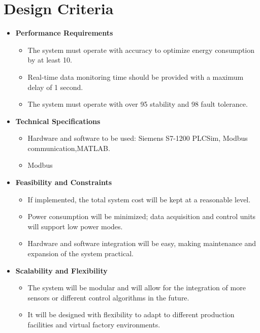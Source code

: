 \section{Design Criteria}
\begin{itemize}
    \item \textbf{Performance Requirements}
    \begin{itemize}
        \item The system must operate with accuracy to optimize energy consumption by at least 10.
        \item Real-time data monitoring time should be provided with a maximum delay of 1 second.
        \item The system must operate with over 95 stability and 98 fault tolerance.
    \end{itemize}

    \item \textbf{Technical Specifications}
    \begin{itemize}
        \item Hardware and software to be used: Siemens S7-1200 PLCSim, Modbus communication,MATLAB.
        \item Modbus
    \end{itemize}

    \item \textbf{Feasibility and Constraints}
    \begin{itemize}
        \item If implemented, the total system cost will be kept at a reasonable level.
        \item Power consumption will be minimized; data acquisition and control units will support low power modes.
        \item Hardware and software integration will be easy, making maintenance and expansion of the system practical.
    \end{itemize}

    \item \textbf{Scalability and Flexibility}
    \begin{itemize}
        \item The system will be modular and will allow for the integration of more sensors or different control algorithms in the future.
        \item It will be designed with flexibility to adapt to different production facilities and virtual factory environments.
    \end{itemize}


\end{itemize}
